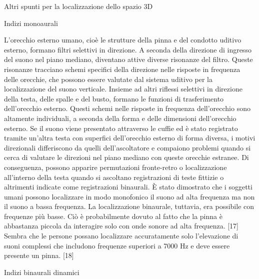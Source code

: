 Altri spunti per la localizzazione dello spazio 3D

Indizi monoaurali

L'orecchio esterno umano, cioè le strutture della pinna e del condotto uditivo
esterno, formano filtri selettivi in ​​direzione. A seconda della direzione di
ingresso del suono nel piano mediano, diventano attive diverse risonanze del
filtro. Queste risonanze tracciano schemi specifici della direzione nelle risposte
in frequenza delle orecchie, che possono essere valutate dal sistema uditivo per
la localizzazione del suono verticale. Insieme ad altri riflessi selettivi in
​direzione della testa, delle spalle e del busto, formano le funzioni di trasferimento
dell'orecchio esterno. Questi schemi nelle risposte in frequenza dell'orecchio sono
altamente individuali, a seconda della forma e delle dimensioni dell'orecchio
esterno. Se il suono viene presentato attraverso le cuffie ed è stato registrato
tramite un'altra testa con superfici dell'orecchio esterno di forma diversa, i
motivi direzionali differiscono da quelli dell'ascoltatore e compaiono problemi
quando si cerca di valutare le direzioni nel piano mediano con queste orecchie
estranee. Di conseguenza, possono apparire permutazioni fronte-retro o localizzazione
all'interno della testa quando si ascoltano registrazioni di teste fittizie o
altrimenti indicate come registrazioni binaurali. È stato dimostrato che i
soggetti umani possono localizzare in modo monofonico il suono ad alta frequenza
ma non il suono a bassa frequenza. La localizzazione binaurale, tuttavia, era
possibile con frequenze più basse. Ciò è probabilmente dovuto al fatto che la
pinna è abbastanza piccola da interagire solo con onde sonore ad alta frequenza.
[17] Sembra che le persone possano localizzare accuratamente solo l'elevazione di
suoni complessi che includono frequenze superiori a 7000 Hz e deve essere presente
un pinna. [18]

Indizi binaurali dinamici


